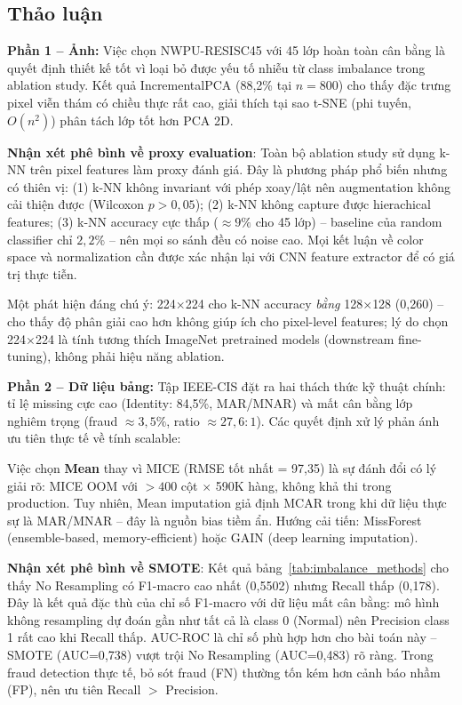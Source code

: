 \documentclass[12pt,a4paper]{article}
\let\oldtextbf\textbf
\renewcommand{\textbf}[1]{\oldtextbf{\textcolor{hcmublue}{#1}}}
\begin{document}
\subsection{Thảo luận}

\textbf{Phần 1 -- Ảnh:}
Việc chọn NWPU-RESISC45 với 45 lớp hoàn toàn cân bằng là quyết định thiết kế tốt vì loại bỏ được yếu tố nhiễu từ class imbalance trong ablation study. Kết quả IncrementalPCA (88{,}2\% tại $n=800$) cho thấy đặc trưng pixel viễn thám có chiều thực rất cao, giải thích tại sao t-SNE (phi tuyến, $O(n^2)$) phân tách lớp tốt hơn PCA 2D.

\textbf{Nhận xét phê bình về proxy evaluation}: Toàn bộ ablation study sử dụng k-NN trên pixel features làm proxy đánh giá. Đây là phương pháp phổ biến nhưng có thiên vị: (1) k-NN không invariant với phép xoay/lật nên augmentation không cải thiện được (Wilcoxon $p > 0{,}05$); (2) k-NN không capture được hierachical features; (3) k-NN accuracy cực thấp ($\approx 9\%$ cho 45 lớp) -- baseline của random classifier chỉ $2{,}2\%$ -- nên mọi so sánh đều có noise cao. Mọi kết luận về color space và normalization cần được xác nhận lại với CNN feature extractor để có giá trị thực tiễn.

Một phát hiện đáng chú ý: 224$\times$224 cho k-NN accuracy \textit{bằng} 128$\times$128 (0{,}260) -- cho thấy độ phân giải cao hơn không giúp ích cho pixel-level features; lý do chọn 224$\times$224 là tính tương thích ImageNet pretrained models (downstream fine-tuning), không phải hiệu năng ablation.

\textbf{Phần 2 -- Dữ liệu bảng:}
Tập IEEE-CIS đặt ra hai thách thức kỹ thuật chính: tỉ lệ missing cực cao (Identity: 84,5\%, MAR/MNAR) và mất cân bằng lớp nghiêm trọng (fraud $\approx 3{,}5\%$, ratio $\approx 27{,}6:1$). Các quyết định xử lý phản ánh ưu tiên thực tế về tính scalable:

Việc chọn \textbf{Mean} thay vì MICE (RMSE tốt nhất = 97{,}35) là sự đánh đổi có lý giải rõ: MICE OOM với $>400$ cột $\times$ 590K hàng, không khả thi trong production. Tuy nhiên, Mean imputation giả định MCAR trong khi dữ liệu thực sự là MAR/MNAR -- đây là nguồn bias tiềm ẩn. Hướng cải tiến: MissForest (ensemble-based, memory-efficient) hoặc GAIN (deep learning imputation).

\textbf{Nhận xét phê bình về SMOTE}: Kết quả bảng~\ref{tab:imbalance_methods} cho thấy No Resampling có F1-macro cao nhất (0{,}5502) nhưng Recall thấp (0{,}178). Đây là kết quả đặc thù của chỉ số F1-macro với dữ liệu mất cân bằng: mô hình không resampling dự đoán gần như tất cả là class 0 (Normal) nên Precision class 1 rất cao khi Recall thấp. AUC-ROC là chỉ số phù hợp hơn cho bài toán này -- SMOTE (AUC=0{,}738) vượt trội No Resampling (AUC=0{,}483) rõ ràng. Trong fraud detection thực tế, bỏ sót fraud (FN) thường tốn kém hơn cảnh báo nhầm (FP), nên ưu tiên Recall $>$ Precision.
\end{document}

